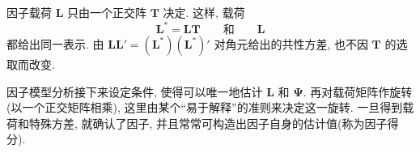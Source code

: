 \begin{mvbox}
因子载荷 $\mathbf{L}$ 只由一个正交阵 $\mathbf{T}$ 决定. 这样, 载荷
\label{eq:9-9}
\begin{equation}
\mathbf{L}^*=\mathbf{L}\mathbf{T}\qquad\text{和}\qquad \mathbf{L}
\tag{9-9}
\end{equation}
都给出同一表示. 由 $\mathbf{L}\mathbf{L}'=(\mathbf{L}^*)(\mathbf{L}^*)'$ 对角元给出的共性方差, 也不因 $\mathbf{T}$ 的选取而改变.
\end{mvbox}

因子模型分析接下来设定条件, 使得可以唯一地估计 $\mathbf{L}$ 和 $\boldsymbol{\Psi}$. 再对载荷矩阵作旋转(以一个正交矩阵相乘), 这里由某个“易于解释”的准则来决定这一旋转. 一旦得到载荷和特殊方差, 就确认了因子, 并且常常可构造出因子自身的估计值(称为因子得分).
